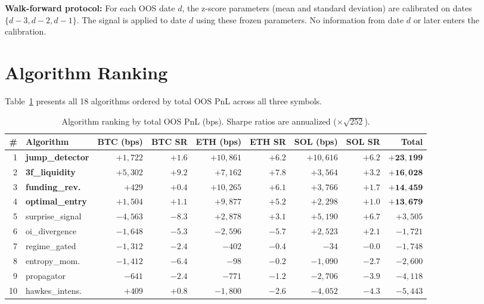 \documentclass[11pt,a4paper]{article}
\newcommand{\toprule}{\hline\hline}
\newcommand{\midrule}{\hline}
\begin{document}
\textbf{Walk-forward protocol:} For each OOS date $d$, the z-score parameters (mean and standard deviation) are calibrated on dates $\{d-3, d-2, d-1\}$. The signal is applied to date $d$ using these frozen parameters. No information from date $d$ or later enters the calibration.

\section{Algorithm Ranking}

Table~\ref{tab:ranking} presents all 18 algorithms ordered by total OOS PnL across all three symbols.

\begin{table}[h!]
\centering
\caption{Algorithm ranking by total OOS PnL (bps). Sharpe ratios are annualized ($\times\sqrt{252}$).}
\label{tab:ranking}
\small
\begin{tabular}{@{}rlrrrrrrr@{}}
\toprule
\# & Algorithm & BTC (bps) & BTC SR & ETH (bps) & ETH SR & SOL (bps) & SOL SR & Total \\
\midrule
1 & \textbf{jump\_detector} & $+1{,}722$ & $+1.6$ & $+10{,}861$ & $+6.2$ & $+10{,}616$ & $+6.2$ & $\mathbf{+23{,}199}$ \\
2 & \textbf{3f\_liquidity} & $+5{,}302$ & $+9.2$ & $+7{,}162$ & $+7.8$ & $+3{,}564$ & $+3.2$ & $\mathbf{+16{,}028}$ \\
3 & \textbf{funding\_rev.} & $+429$ & $+0.4$ & $+10{,}265$ & $+6.1$ & $+3{,}766$ & $+1.7$ & $\mathbf{+14{,}459}$ \\
4 & \textbf{optimal\_entry} & $+1{,}504$ & $+1.1$ & $+9{,}877$ & $+5.2$ & $+2{,}298$ & $+1.0$ & $\mathbf{+13{,}679}$ \\
5 & surprise\_signal & $-4{,}563$ & $-8.3$ & $+2{,}878$ & $+3.1$ & $+5{,}190$ & $+6.7$ & $+3{,}505$ \\
\midrule
6 & oi\_divergence & $-1{,}648$ & $-5.3$ & $-2{,}596$ & $-5.7$ & $+2{,}523$ & $+2.1$ & $-1{,}721$ \\
7 & regime\_gated & $-1{,}312$ & $-2.4$ & $-402$ & $-0.4$ & $-34$ & $-0.0$ & $-1{,}748$ \\
8 & entropy\_mom. & $-1{,}412$ & $-6.4$ & $-98$ & $-0.2$ & $-1{,}090$ & $-2.7$ & $-2{,}600$ \\
9 & propagator & $-641$ & $-2.4$ & $-771$ & $-1.2$ & $-2{,}706$ & $-3.9$ & $-4{,}118$ \\
10 & hawkes\_intens. & $+409$ & $+0.8$ & $-1{,}800$ & $-2.6$ & $-4{,}052$ & $-4.3$ & $-5{,}443$ \\

\end{tabular}
\end{table}
\end{document}
